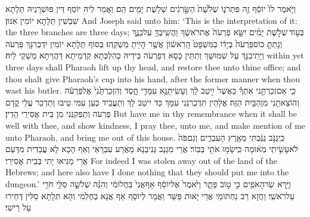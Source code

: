 {וַיֹּ֤אמֶר לוֹ֙ יוֹסֵ֔ף זֶ֖ה פִּתְרֹנ֑וֹ שְׁלֹ֙שֶׁת֙ הַשָּׂ֣רִגִ֔ים שְׁלֹ֥שֶׁת יָמִ֖ים הֵֽם׃}
{וַאֲמַר לֵיהּ יוֹסֵף דֵּין פּוּשְׁרָנֵיהּ תְּלָתָא שִׁבְשִׁין תְּלָתָא יוֹמִין אִנּוּן׃}
{And Joseph said unto him: ‘This is the interpretation of it: the three branches are three days;}{}
{בְּע֣וֹד \legarmeh  שְׁלֹ֣שֶׁת יָמִ֗ים יִשָּׂ֤א פַרְעֹה֙ אֶת\maqqaf רֹאשֶׁ֔ךָ וַהֲשִֽׁיבְךָ֖ עַל\maqqaf כַּנֶּ֑ךָ וְנָתַתָּ֤ כוֹס\maqqaf פַּרְעֹה֙ בְּיָד֔וֹ כַּמִּשְׁפָּט֙ הָֽרִאשׁ֔וֹן אֲשֶׁ֥ר הָיִ֖יתָ מַשְׁקֵֽהוּ׃}
{בְּסוֹף תְּלָתָא יוֹמִין יִדְכְרִנָּךְ פַּרְעֹה וְיָתִיבִנָּךְ עַל שִׁמּוּשָׁךְ וְתִתֵּין כָּסָא דְּפַרְעֹה בִּידֵיהּ כְּהִלְכְּתָא קַדְמֵיתָא דַּהֲוֵיתָא מַשְׁקֵי לֵיהּ׃}
{within yet three days shall Pharaoh lift up thy head, and restore thee unto thine office; and thou shalt give Pharaoh’s cup into his hand, after the former manner when thou wast his butler.}{}
{כִּ֧י אִם\maqqaf זְכַרְתַּ֣נִי אִתְּךָ֗ כַּאֲשֶׁר֙ יִ֣יטַב לָ֔ךְ וְעָשִֽׂיתָ\maqqaf נָּ֥א עִמָּדִ֖י חָ֑סֶד וְהִזְכַּרְתַּ֙נִי֙ אֶל\maqqaf פַּרְעֹ֔ה וְהוֹצֵאתַ֖נִי מִן\maqqaf הַבַּ֥יִת הַזֶּֽה׃}
{אֱלָהֵין תִּדְכְרִנַּנִי עִמָּךְ כַּד יִיטַב לָךְ וְתַעֲבֵיד כְּעַן עִמִּי טֵיבוּ וְתַדְכַר עֲלַי קֳדָם פַּרְעֹה וְתַפְּקִנַּנִי מִן בֵּית אֲסִירֵי הָדֵין׃}
{But have me in thy remembrance when it shall be well with thee, and show kindness, I pray thee, unto me, and make mention of me unto Pharaoh, and bring me out of this house.}{}
{כִּֽי\maqqaf גֻנֹּ֣ב גֻּנַּ֔בְתִּי מֵאֶ֖רֶץ הָעִבְרִ֑ים וְגַם\maqqaf פֹּה֙ לֹא\maqqaf עָשִׂ֣יתִֽי מְא֔וּמָה כִּֽי\maqqaf שָׂמ֥וּ אֹתִ֖י בַּבּֽוֹר׃}
{אֲרֵי מִגְנָב גְּנִיבְנָא מֵאֲרַע עִבְרָאֵי וְאַף הָכָא לָא עֲבַדִית מִדָּעַם אֲרֵי מַנִּיאוּ יָתִי בְּבֵית אֲסִירֵי׃}
{For indeed I was stolen away out of the land of the Hebrews; and here also have I done nothing that they should put me into the dungeon.’}{}
{וַיַּ֥רְא שַׂר\maqqaf הָאֹפִ֖ים כִּ֣י ט֣וֹב פָּתָ֑ר וַיֹּ֙אמֶר֙ אֶל\maqqaf יוֹסֵ֔ף אַף\maqqaf אֲנִי֙ בַּחֲלוֹמִ֔י וְהִנֵּ֗ה שְׁלֹשָׁ֛ה סַלֵּ֥י חֹרִ֖י עַל\maqqaf רֹאשִֽׁי׃}
{וַחֲזָא רַב נַחְתּוֹמֵי אֲרֵי יָאוּת פַּשַּׁר וַאֲמַר לְיוֹסֵף אַף אֲנָא בְחֶלְמִי וְהָא תְּלָתָא סַלִּין דְּחֵירוּ עַל רֵישִׁי׃}
